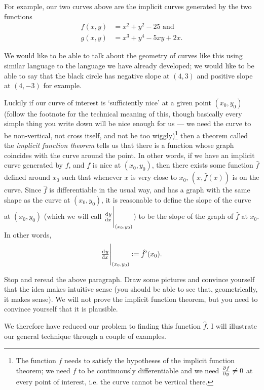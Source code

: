 For example, our two curves above are the implicit curves generated by the two functions
\begin{align*}
  f(x,y) &= x^2 + y^2 - 25 \text{ and} \tag{black}\\
  g(x,y) &= x^3 + y^4 - 5xy + 2x. \tag{red}
\end{align*}

We would like to be able to talk about the geometry of curves like this using similar language to the language we have already developed; we would
like to be able to say that the black circle has negative slope at $ (4,3) $ and positive slope at $ (4,-3) $ for example.

Luckily if our curve of interest is `sufficiently nice' at a given point $ (x_0,y_0) $ (follow the footnote for the technical meaning of this, though
basically every simple thing you write down will be nice enough for us --- we need the curve to be non-vertical, not cross itself, and not be too
wiggly)\footnote{The function $ f $ needs to satisfy the hypotheses of the implicit function theorem; we need $ f $ to be continuously differentiable
and we need $ \pd{f}{y} \neq 0 $ at every point of interest, i.e. the curve cannot be vertical there.}
then a theorem called the \emph{implicit function theorem} tells us that there is a function whose graph coincides with the curve around the point. In
other words, if we have an implicit curve generated by $ f $, and $ f $ is nice at $ (x_0,y_0) $, then there exists some function $ \hat f $ defined
around $ x_0 $ such that whenever $ x $ is very close to $ x_0 $, $ (x,\hat f(x)) $ is on the curve. Since $ \hat f $ is differentiable in the usual way,
and has a graph with the same shape as the curve at $ (x_0,y_0) $, it is reasonable to define the slope of the curve at $ (x_0, y_0) $ (which we will
call $ \eval{\od{y}{x}}_{(x_0,y_0)} $) to be the slope of the graph of $ \hat f $ at $ x_0 $. In other words,
\begin{equation}
  \eval{\od{y}{x}}_{(x_0,y_0)} := \hat f'(x_0).
\end{equation}

Stop and reread the above paragraph. Draw some pictures and convince yourself that the idea makes intuitive sense (you should be able to see that,
geometrically, it makes sense). We will not prove the implicit function theorem, but you need to convince yourself that it is plausible.

We therefore have reduced our problem to finding this function $ \hat f $. I will illustrate our general technique through a couple of examples.

